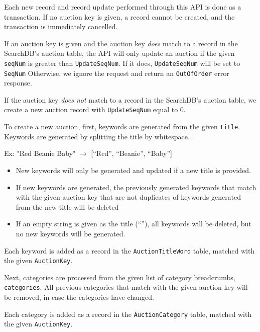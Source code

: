 \documentclass[12pt,a4paper]{article}
\begin{document}
Each new record and record update performed through this API is done as a transaction. 
If no auction key is given, a record cannot be created, and the transaction is immediately cancelled.

\vspace{\baselineskip}

If an auction key is given and the auction key \emph{does} match to a record in the SearchDB's auction table,
the API will only update an auction if the given
\texttt{seqNum} is greater than \texttt{UpdateSeqNum}. If it does, \texttt{UpdateSeqNum} will be set to \texttt{SeqNum}
 Otherwise, we ignore the request
and return an \texttt{OutOfOrder} error response.

If the auction key \emph{does not} match to a record in the SearchDB's auction table,
we create a new auction record with \texttt{UpdateSeqNum} equal to 0. 

\vspace{\baselineskip}



To create a new auction, first, keywords are generated from the given \texttt{title}.
Keywords are generated by splitting the title by whitespace.

Ex: "Red Beanie Baby" $\rightarrow$ [``Red'', ``Beanie'', ``Baby'']

\begin{itemize}
    \item New keywords will only be generated and updated if a new title is provided. 
    \item If new keywords are generated, the previously generated keywords that match with the given auction key that are not duplicates of keywords generated 
    from the new title will be deleted
    \item If an empty string is given as the title (``''), all keywords will be deleted, but no new keywords will be generated.
\end{itemize} 

Each keyword is added as a record in the \texttt{AuctionTitleWord} table, matched with the given \texttt{AuctionKey}.

\vspace{\baselineskip}

Next, categories are processed from the given list of category breadcrumbs, \texttt{categories}.
All previous categories that match with the given auction key will be removed, in case the categories have changed.

\vspace{\baselineskip}
Each category is added as a record in the \texttt{AuctionCategory} table, matched with the given \texttt{AuctionKey}.
\end{document}
